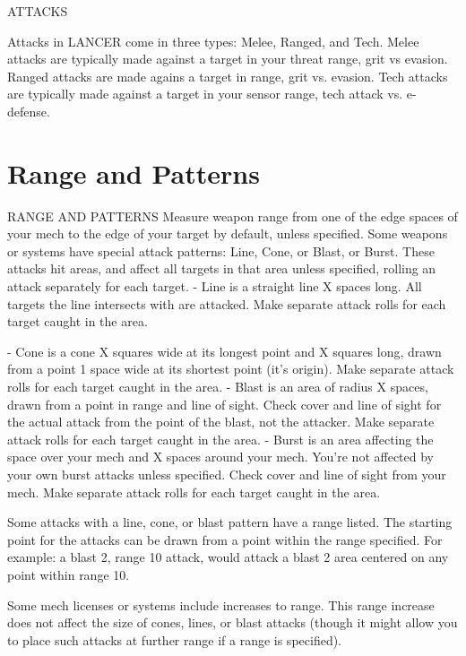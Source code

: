                                             ATTACKS

Attacks in LANCER come in three types: Melee, Ranged, and Tech. Melee attacks are typically
made against a target in your threat range, grit vs evasion. Ranged attacks are made agains a
target in range, grit vs. evasion. Tech attacks are typically made against a target in your sensor
range, tech attack vs. e-defense.

\section{Range and Patterns}
                                      RANGE AND PATTERNS
Measure weapon range from one of the edge spaces of your mech to the edge of your target by
default, unless specified.
Some weapons or systems have special attack patterns: Line, Cone, or Blast, or Burst. These
attacks hit areas, and affect all targets in that area unless specified, rolling an attack separately
for each target.
    -    Line is a straight line X spaces long. All targets the line intersects with are attacked. Make
         separate attack rolls for each target caught in the area.




     -   Cone is a cone X squares wide at its longest point and X squares long, drawn from a point
         1 space wide at its shortest point (it’s origin). Make separate attack rolls for each target
         caught in the area.
    -    Blast is an area of radius X spaces, drawn from a point in range and line of sight. Check
         cover and line of sight for the actual attack from the point of the blast, not the attacker.
         Make separate attack rolls for each target caught in the area.
    -    Burst is an area affecting the space over your mech and X spaces around your mech.
         You’re not affected by your own burst attacks unless specified. Check cover and line of
         sight from your mech. Make separate attack rolls for each target caught in the area.

Some attacks with a line, cone, or blast pattern have a range listed. The starting point for the
attacks can be drawn from a point within the range specified. For example: a blast 2, range 10
attack, would attack a blast 2 area centered on any point within range 10.

Some mech licenses or systems include increases to range. This range increase does not affect
the size of cones, lines, or blast attacks (though it might allow you to place such attacks at further
range if a range is specified).
